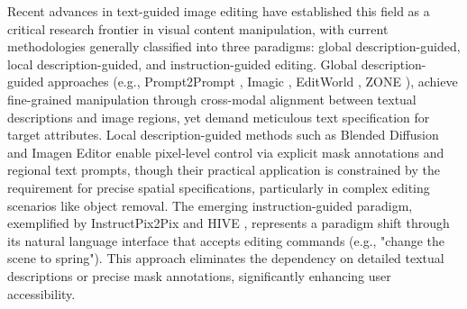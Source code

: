 
Recent advances in text-guided image editing have established this field as a critical research frontier in visual content manipulation, with current methodologies generally classified into three paradigms: global description-guided, local description-guided, and instruction-guided editing. Global description-guided approaches (e.g., Prompt2Prompt \cite{p2p}, Imagic \cite{kawar2023imagic}, EditWorld \cite{editworld}, ZONE \cite{li2024zone} ), achieve fine-grained manipulation through cross-modal alignment between textual descriptions and image regions, yet demand meticulous text specification for target attributes. Local description-guided methods such as Blended Diffusion \cite{avrahami2022blended} and Imagen Editor \cite{imageneditor} enable pixel-level control via explicit mask annotations and regional text prompts, though their practical application is constrained by the requirement for precise spatial specifications, particularly in complex editing scenarios like object removal. The emerging instruction-guided paradigm, exemplified by InstructPix2Pix \cite{brooks2023instructpix2pix} and HIVE \cite{zhang2024hive}, represents a paradigm shift through its natural language interface that accepts editing commands (e.g., "change the scene to spring"). This approach eliminates the dependency on detailed textual descriptions or precise mask annotations, significantly enhancing user accessibility.

